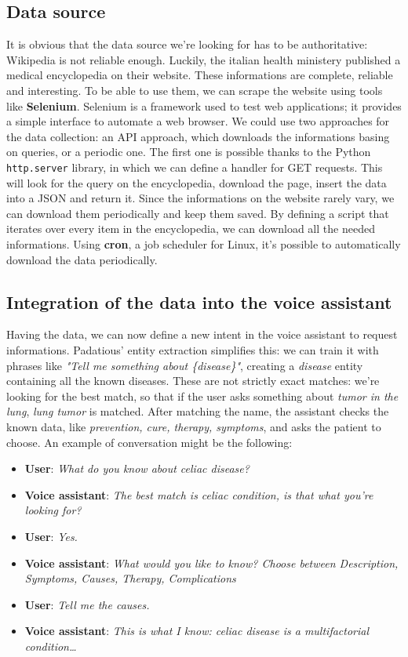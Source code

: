 \documentclass[conference]{IEEEtran}
\begin{document}
\subsection{Data source}
It is obvious that the data source we're looking for has to be authoritative: Wikipedia is not reliable enough. Luckily, the italian health ministery published a medical encyclopedia on their website. These informations are complete, reliable and interesting. To be able to use them, we can scrape the website using tools like \textbf{Selenium}. Selenium is a framework used to test web applications; it provides a simple interface to automate a web browser. We could use two approaches for the data collection: an API approach, which downloads the informations basing on queries, or a periodic one. The first one is possible thanks to the Python \texttt{http.server} library, in which we can define a handler for GET requests. This will look for the query on the encyclopedia, download the page, insert the data into a JSON and return it. Since the informations on the website rarely vary, we can download them periodically and keep them saved. By defining a script that iterates over every item in the encyclopedia, we can download all the needed informations. Using \textbf{cron}, a job scheduler for Linux, it's possible to automatically download the data periodically.
\subsection{Integration of the data into the voice assistant}
Having the data, we can now define a new intent in the voice assistant to request informations. Padatious' entity extraction simplifies this: we can train it with phrases like \textit{"Tell me something about \{disease\}"}, creating a \textit{disease} entity containing all the known diseases. These are not strictly exact matches: we're looking for the best match, so that if the user asks something about \textit{tumor in the lung}, \textit{lung tumor} is matched. After matching the name, the assistant checks the known data, like \textit{prevention, cure, therapy, symptoms}, and asks the patient to choose.
An example of conversation might be the following:
\begin{itemize}
    \item \textbf{User}: \textit{What do you know about celiac disease?}
    \item \textbf{Voice assistant}: \textit{The best match is celiac condition, is that what you're looking for?}
    \item \textbf{User}: \textit{Yes.}
    \item \textbf{Voice assistant}: \textit{What would you like to know? Choose between Description, Symptoms, Causes, Therapy, Complications}
    \item \textbf{User}: \textit{Tell me the causes.}
    \item \textbf{Voice assistant}: \textit{This is what I know: celiac disease is a multifactorial condition\dots}
\end{itemize}
\end{document}
